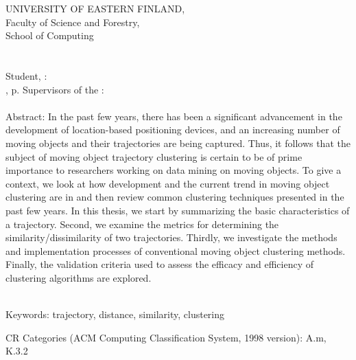 \vspace{0.5cm}

\thispagestyle{empty}

\begin{spacing}{1.0}
\newpage


UNIVERSITY OF EASTERN FINLAND, \\ Faculty of Science and Forestry, \campus \\ School of Computing \\
\facultyschooleng \\ \\
Student, \authorname : \thesistitle \\
\documenttypeeng , \mypagecount p.
Supervisors of the \documenttypeeng : \supervisorseng \\
\ajankohtaenglish \\

Abstract: In the past few years, there has been a significant advancement in the development of location-based positioning devices, and an increasing number of moving objects and their trajectories are being captured. Thus, it follows that the subject of moving object trajectory clustering is certain to be of prime importance to researchers working on data mining on moving objects. To give a context, we look at how development and the current trend in moving object clustering are in and then review common clustering techniques presented in the past few years.  In this thesis, we start by summarizing the basic characteristics of a trajectory. Second, we examine the metrics for determining the similarity/dissimilarity of two trajectories. Thirdly, we investigate the methods and implementation processes of conventional moving object clustering methods. Finally, the validation criteria used to assess the efficacy and efficiency of clustering algorithms are explored. 


~\\ %
Keywords:
trajectory, distance, similarity, clustering




CR Categories (ACM Computing Classification System,
1998 version): A.m, K.3.2\\

\end{spacing}

